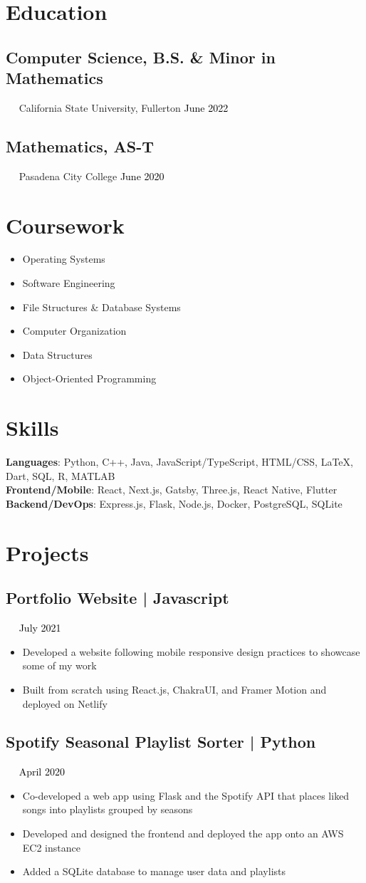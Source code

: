 \documentclass{article}
\newcommand{\resumesection}[3]{
    \subsection*{#1}
    \ 
    \ 
    \small
    \textcolor{csufgrey}{#2}
    \normalsize
    \hfill
    \textcolor{black}{#3}
    \normalsize
}
\begin{document}
\pagestyle{useheader}

\section*{Education}
\resumesection{Computer Science, B.S. \& Minor in Mathematics}{California State University, Fullerton}{June 2022}%
\resumesection{Mathematics, AS-T}{Pasadena City College}{June 2020}
\section*{Coursework}
\setlength{\multicolsep}{0pt}
\begin{multicols}{2}
    \noindent
    \begin{itemize}
        \item Operating Systems
        \item Software Engineering
        \item File Structures \& Database Systems
        \item Computer Organization
        \item Data Structures
        \item Object-Oriented Programming
    \end{itemize}
\end{multicols}
\hfill
\section*{Skills}
\textbf{Languages}: Python, C++, Java, JavaScript/TypeScript, HTML/CSS, {\selectfont\LaTeX}, Dart, SQL, R, MATLAB\\
\textbf{Frontend/Mobile}: React, Next.js, Gatsby, Three.js, React Native, Flutter\\
\textbf{Backend/DevOps}: Express.js, Flask, Node.js, Docker, PostgreSQL, SQLite\\
\section*{Projects}
\resumesection{Portfolio Website | Javascript}{}{July 2021}
\begin{itemize}
    \item Developed a website following mobile responsive design practices to showcase some of my work
    \item Built from scratch using React.js, ChakraUI, and Framer Motion and deployed on Netlify
\end{itemize}
\resumesection{Spotify Seasonal Playlist Sorter | Python}{}{April 2020}
\begin{itemize}
    \item Co-developed a web app using Flask and the Spotify API that places liked songs into playlists grouped by seasons
    \item Developed and designed the frontend and deployed the app onto an AWS EC2 instance
    \item Added a SQLite database to manage user data and playlists
\end{itemize}
\end{document}
